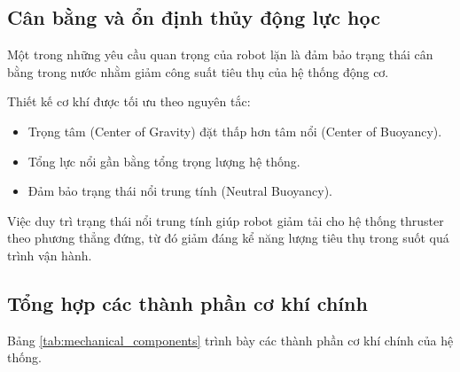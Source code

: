 \documentclass[../DoAn.tex]{subfiles}
\begin{document}
\subsection{Cân bằng và ổn định thủy động lực học}

Một trong những yêu cầu quan trọng của robot lặn là đảm bảo trạng thái cân bằng trong nước nhằm giảm công suất tiêu thụ của hệ thống động cơ.

Thiết kế cơ khí được tối ưu theo nguyên tắc:

\begin{itemize}
    \item Trọng tâm (Center of Gravity) đặt thấp hơn tâm nổi (Center of Buoyancy).
    \item Tổng lực nổi gần bằng tổng trọng lượng hệ thống.
    \item Đảm bảo trạng thái nổi trung tính (Neutral Buoyancy).
\end{itemize}

Việc duy trì trạng thái nổi trung tính giúp robot giảm tải cho hệ thống thruster theo phương thẳng đứng, từ đó giảm đáng kể năng lượng tiêu thụ trong suốt quá trình vận hành.

\subsection{Tổng hợp các thành phần cơ khí chính}

Bảng \ref{tab:mechanical_components} trình bày các thành phần cơ khí chính của hệ thống.
\end{document}
